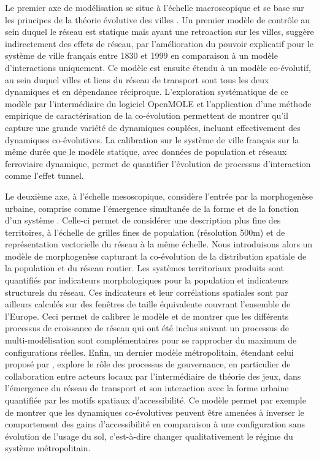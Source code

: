 \documentclass[11pt]{article}
\begin{document}
Le premier axe de modélisation se situe à l'échelle macroscopique et se base sur les principes de la théorie évolutive des villes \citep{pumain1997pour}. Un premier modèle de contrôle au sein duquel le réseau est statique mais ayant une retroaction sur les villes, suggère indirectement des effets de réseau, par l'amélioration du pouvoir explicatif pour le système de ville français entre 1830 et 1999 en comparaison à un modèle d'interactions uniquement. Ce modèle est ensuite étendu à un modèle co-évolutif, au sein duquel villes et liens du réseau de transport sont tous les deux dynamiques et en dépendance réciproque. L'exploration systématique de ce modèle par l'intermédiaire du logiciel OpenMOLE \citep{reuillon2013openmole} et l'application d'une méthode empirique de caractérisation de la co-évolution permettent de montrer qu'il capture une grande variété de dynamiques couplées, incluant effectivement des dynamiques co-évolutives. La calibration sur le système de ville français sur la même durée que le modèle statique, avec données de population et réseaux ferroviaire dynamique, permet de quantifier l'évolution de processus d'interaction comme l'effet tunnel.


Le deuxième axe, à l'échelle mesoscopique, considère l'entrée par la morphogenèse urbaine, comprise comme l'émergence simultanée de la forme et de la fonction d'un système \citep{doursat2012morphogenetic}. Celle-ci permet de considérer une description plus fine des territoires, à l'échelle de grilles fines de population (résolution 500m) et de représentation vectorielle du réseau à la même échelle. Nous introduisons alors un modèle de morphogenèse capturant la co-évolution de la distribution spatiale de la population et du réseau routier. Les systèmes territoriaux produits sont quantifiés par indicateurs morphologiques pour la population \citep{le2015forme} et indicateurs structurels du réseau. Ces indicateurs et leur corrélations spatiales sont par ailleurs calculés sur des fenêtres de taille équivalente couvrant l'ensemble de l'Europe. Ceci permet de calibrer le modèle et de montrer que les différents processus de croissance de réseau qui ont été inclus suivant un processus de multi-modélisation sont complémentaires pour se rapprocher du maximum de configurations réelles. Enfin, un dernier modèle métropolitain, étendant celui proposé par \citep{lenechet:halshs-01272236}, explore le rôle des processus de gouvernance, en particulier de collaboration entre acteurs locaux par l'intermédiaire de théorie des jeux, dans l'émergence du réseau de transport et son interaction avec la forme urbaine quantifiée par les motifs spatiaux d'accessibilité. Ce modèle permet par exemple de montrer que les dynamiques co-évolutives peuvent être amenées à inverser le comportement des gains d'accessibilité en comparaison à une configuration sans évolution de l'usage du sol, c'est-à-dire changer qualitativement le régime du système métropolitain.
\end{document}
